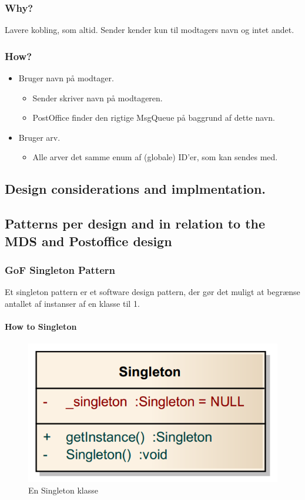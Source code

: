 \subsubsection{Why?}
Lavere kobling, som altid. Sender kender kun til modtagers navn og intet andet.

\subsubsection{How?}

\begin{itemize}
	\item Bruger navn på modtager.
	\begin{itemize}
		\item Sender skriver navn på modtageren.
		\item PostOffice finder den rigtige MsgQueue på baggrund af dette navn.
	\end{itemize}
	\item Bruger arv.
	\begin{itemize}
		\item Alle arver det samme enum af (globale) ID'er, som kan sendes med.
	\end{itemize}
\end{itemize}


\subsection{Design considerations and implmentation.}

\subsection{Patterns per design and in relation to the MDS and Postoffice design}

\subsubsection{GoF Singleton Pattern}

Et singleton pattern er et software design pattern, der gør det muligt at begrænse antallet af instanser af en klasse til 1.

\paragraph{How to Singleton}
\begin{figure}[h]
	\centering
	\includegraphics[width=0.4\linewidth]{figs/spm5/singletonclassdia}
	\caption{En Singleton klasse}
	\label{fig:SingletonClass}
\end{figure}

